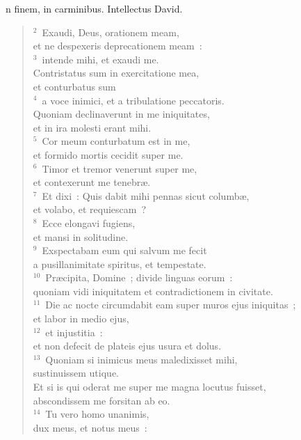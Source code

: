 \bchapter
{}n finem, in carminibus. Intellectus David.
\begin{flushleft}\begin{verse}\vspace{6pt}${}^{2}$~Exaudi, Deus, orationem meam,\\ et ne despexeris deprecationem meam~:\\
${}^{3}$~intende mihi, et exaudi me.\\ Contristatus sum in exercitatione mea,\\ et conturbatus sum\\
${}^{4}$~a voce inimici, et a tribulatione peccatoris.\\ Quoniam declinaverunt in me iniquitates,\\ et in ira molesti erant mihi.\\
${}^{5}$~Cor meum conturbatum est in me,\\ et formido mortis cecidit super me.\\
${}^{6}$~Timor et tremor venerunt super me,\\ et contexerunt me tenebr\ae .\\
${}^{7}$~Et dixi~: Quis dabit mihi pennas sicut columb\ae ,\\ et volabo, et requiescam~?\\
${}^{8}$~Ecce elongavi fugiens,\\ et mansi in solitudine.\\
${}^{9}$~Exspectabam eum qui salvum me fecit\\ a pusillanimitate spiritus, et tempestate.\\
${}^{10}$~Pr\ae cipita, Domine~; divide linguas eorum~:\\ quoniam vidi iniquitatem et contradictionem in civitate.\\
${}^{11}$~Die ac nocte circumdabit eam super muros ejus iniquitas~;\\ et labor in medio ejus,\\
${}^{12}$~et injustitia~:\\ et non defecit de plateis ejus usura et dolus.\\
${}^{13}$~Quoniam si inimicus meus maledixisset mihi,\\ sustinuissem utique.\\ Et si is qui oderat me super me magna locutus fuisset,\\ abscondissem me forsitan ab eo.\\
${}^{14}$~Tu vero homo unanimis,\\ dux meus, et notus meus~:\\

\end{verse}
\end{flushleft}

